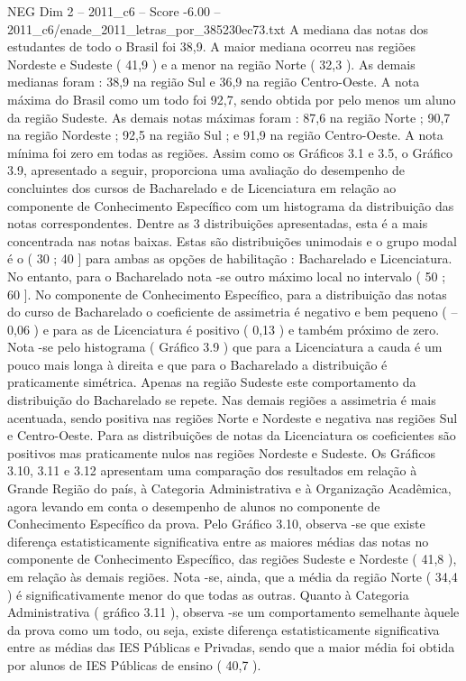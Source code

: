 \begin{textsample}{NEG Dim 2 – 2011\_c6 – Score -6.00 – 2011\_c6/enade\_2011\_letras\_por\_385230ec73.txt}
A mediana das notas dos estudantes de todo o Brasil foi 38,9.
A maior mediana ocorreu nas regiões Nordeste e Sudeste ( 41,9 ) e a menor na região Norte ( 32,3 ).
As demais medianas foram : 38,9 na região Sul e 36,9 na região Centro-Oeste.
A nota máxima do Brasil como um todo foi 92,7, sendo obtida por pelo menos um aluno da região Sudeste.
As demais notas máximas foram : 87,6 na região Norte ; 90,7 na região Nordeste ; 92,5 na região Sul ; e 91,9 na região Centro-Oeste.
A nota mínima foi zero em todas as regiões.
Assim como os Gráficos 3.1 e 3.5, o Gráfico 3.9, apresentado a seguir, proporciona uma avaliação do desempenho de concluintes dos cursos de Bacharelado e de Licenciatura em relação ao componente de Conhecimento Específico com um histograma da distribuição das notas correspondentes.
Dentre as 3 distribuições apresentadas, esta é a mais concentrada nas notas baixas.
Estas são distribuições unimodais e o grupo modal é o ( 30 ; 40 ] para ambas as opções de habilitação : Bacharelado e Licenciatura.
No entanto, para o Bacharelado nota -se outro máximo local no intervalo ( 50 ; 60 ].
No componente de Conhecimento Específico, para a distribuição das notas do curso de Bacharelado o coeficiente de assimetria é negativo e bem pequeno ( – 0,06 ) e para as de Licenciatura é positivo ( 0,13 ) e também próximo de zero.
Nota -se pelo histograma ( Gráfico 3.9 ) que para a Licenciatura a cauda é um pouco mais longa à direita e que para o Bacharelado a distribuição é praticamente simétrica.
Apenas na região Sudeste este comportamento da distribuição do Bacharelado se repete.
Nas demais regiões a assimetria é mais acentuada, sendo positiva nas regiões Norte e Nordeste e negativa nas regiões Sul e Centro-Oeste.
Para as distribuições de notas da Licenciatura os coeficientes são positivos mas praticamente nulos nas regiões Nordeste e Sudeste.
Os Gráficos 3.10, 3.11 e 3.12 apresentam uma comparação dos resultados em relação à Grande Região do país, à Categoria Administrativa e à Organização Acadêmica, agora levando em conta o desempenho de alunos no componente de Conhecimento Específico da prova.
Pelo Gráfico 3.10, observa -se que existe diferença estatisticamente significativa entre as maiores médias das notas no componente de Conhecimento Específico, das regiões Sudeste e Nordeste ( 41,8 ), em relação às demais regiões.
Nota -se, ainda, que a média da região Norte ( 34,4 ) é significativamente menor do que todas as outras.
Quanto à Categoria Administrativa ( gráfico 3.11 ), observa -se um comportamento semelhante àquele da prova como um todo, ou seja, existe diferença estatisticamente significativa entre as médias das IES Públicas e Privadas, sendo que a maior média foi obtida por alunos de IES Públicas de ensino ( 40,7 ).

\end{textsample}
